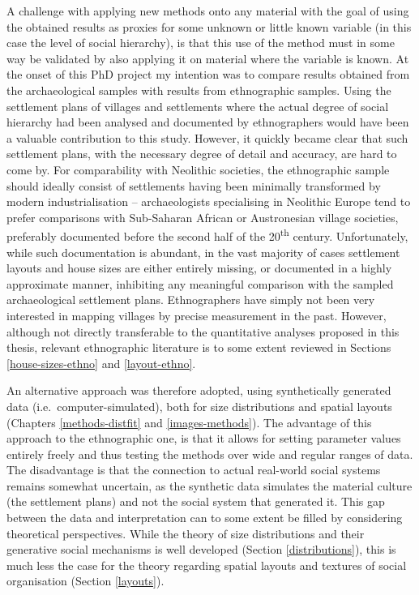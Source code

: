 \documentclass[
  12pt,
  a4paper, twoside]{book}
\begin{document}
A challenge with applying new methods onto any material with the goal of using the obtained results as proxies for some unknown or little known variable (in this case the level of social hierarchy), is that this use of the method must in some way be validated by also applying it on material where the variable is known. At the onset of this PhD project my intention was to compare results obtained from the archaeological samples with results from ethnographic samples. Using the settlement plans of villages and settlements where the actual degree of social hierarchy had been analysed and documented by ethnographers would have been a valuable contribution to this study. However, it quickly became clear that such settlement plans, with the necessary degree of detail and accuracy, are hard to come by. For comparability with Neolithic societies, the ethnographic sample should ideally consist of settlements having been minimally transformed by modern industrialisation -- archaeologists specialising in Neolithic Europe tend to prefer comparisons with Sub-Saharan African or Austronesian village societies, preferably documented before the second half of the 20\textsuperscript{th} century. Unfortunately, while such documentation is abundant, in the vast majority of cases settlement layouts and house sizes are either entirely missing, or documented in a highly approximate manner, inhibiting any meaningful comparison with the sampled archaeological settlement plans. Ethnographers have simply not been very interested in mapping villages by precise measurement in the past. However, although not directly transferable to the quantitative analyses proposed in this thesis, relevant ethnographic literature is to some extent reviewed in Sections \ref{house-sizes-ethno} and \ref{layout-ethno}.

An alternative approach was therefore adopted, using synthetically generated data (i.e.~computer-simulated), both for size distributions and spatial layouts (Chapters \ref{methods-distfit} and \ref{images-methods}). The advantage of this approach to the ethnographic one, is that it allows for setting parameter values entirely freely and thus testing the methods over wide and regular ranges of data. The disadvantage is that the connection to actual real-world social systems remains somewhat uncertain, as the synthetic data simulates the material culture (the settlement plans) and not the social system that generated it. This gap between the data and interpretation can to some extent be filled by considering theoretical perspectives. While the theory of size distributions and their generative social mechanisms is well developed (Section \ref{distributions}), this is much less the case for the theory regarding spatial layouts and textures of social organisation (Section \ref{layouts}).
\end{document}
